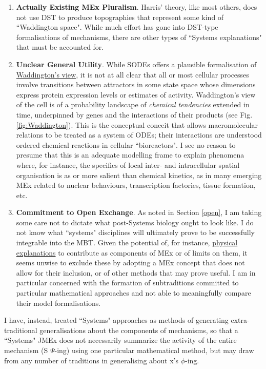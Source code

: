 \begin{enumerate}
\item \textbf{Actually Existing MEx Pluralism}. Harris' theory, like most others, does not use DST to produce topographies that represent some kind of ``Waddington space". While much effort has gone into DST-type formalisations of mechanisms, there are other types of ``Systems explanations" that must be accounted for.

\item \textbf{Unclear General Utility}. While SODEs offers a plausible formalisation of \hyperref[Waddington]{Waddington's view}, it is not at all clear that all or most cellular processes involve transitions between attractors in some state space whose dimensions express protein expression levels or estimates of activity. Waddington's view of the cell is of a probability landscape of \textit{chemical tendencies} extended in time, underpinned by genes and the interactions of their products (see Fig. \ref{fig:Waddington}). This is the conceptual conceit that allows macromolecular relations to be treated as a system of ODEs; their interactions are understood ordered chemical reactions in cellular ``bioreactors". I see no reason to presume that this is an adequate modelling frame to explain phenomena where, for instance, the specifics of local inter- and intracellular spatial organisation is as or more salient than chemical kinetics, as in many emerging MEx related to nuclear behaviours, transcription factories, tissue formation, etc. 

\item \textbf{Commitment to Open Exchange}. As noted in Section \ref{open}, I am taking some care not to dictate what post-Systems biology ought to look like. I do not know what ``systems" disciplines will ultimately prove to be successfully integrable into the MBT. Given the potential of, for instance, \hyperref[physex]{physical explanations} to contribute as components of MEx \cite{Morange2011} or of limits on them, it seems unwise to exclude these by adopting a MEx concept that does not allow for their inclusion, or of other methods that may prove useful. I am in particular concerned with the formation of subtraditions committed to particular mathematical approaches and not able to meaningfully compare their model formalisations.
\end{enumerate}

I have, instead, treated ``Systems" approaches as methods of generating extra-traditional generalisations about the components of mechanisms, so that a ``Systems" JMEx does not necessarily summarize the activity of the entire mechanism (S $\Psi$-ing) using one particular mathematical method, but may draw from any number of traditions in generalising about x's $\phi$-ing.

